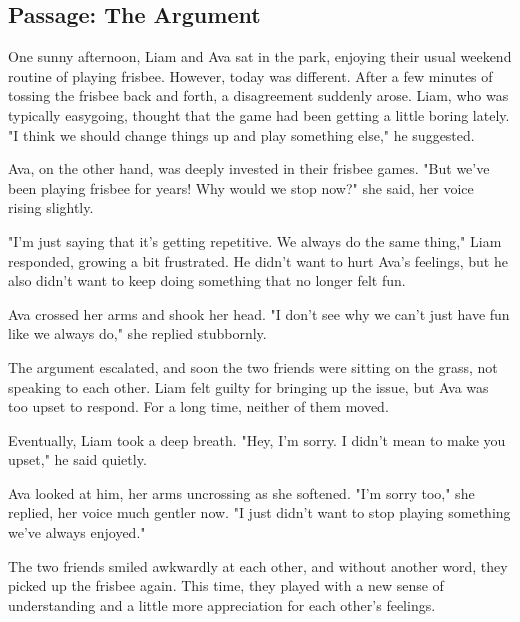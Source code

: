 \documentclass[12pt]{article}
\begin{document}
\onehalfspacing

\subsection*{Passage: The Argument}

\begin{tcolorbox}[colframe=black!40, colback=gray!5]
\begin{spacing}{1.15}
    One sunny afternoon, Liam and Ava sat in the park, enjoying their usual weekend routine of playing frisbee. However, today was different. After a few minutes of tossing the frisbee back and forth, a disagreement suddenly arose. Liam, who was typically easygoing, thought that the game had been getting a little boring lately. "I think we should change things up and play something else," he suggested.

    Ava, on the other hand, was deeply invested in their frisbee games. "But we’ve been playing frisbee for years! Why would we stop now?" she said, her voice rising slightly.

    "I’m just saying that it’s getting repetitive. We always do the same thing," Liam responded, growing a bit frustrated. He didn’t want to hurt Ava’s feelings, but he also didn’t want to keep doing something that no longer felt fun.

    Ava crossed her arms and shook her head. "I don’t see why we can’t just have fun like we always do," she replied stubbornly.

    The argument escalated, and soon the two friends were sitting on the grass, not speaking to each other. Liam felt guilty for bringing up the issue, but Ava was too upset to respond. For a long time, neither of them moved.

    Eventually, Liam took a deep breath. "Hey, I’m sorry. I didn’t mean to make you upset," he said quietly.

    Ava looked at him, her arms uncrossing as she softened. "I’m sorry too," she replied, her voice much gentler now. "I just didn’t want to stop playing something we’ve always enjoyed."

    The two friends smiled awkwardly at each other, and without another word, they picked up the frisbee again. This time, they played with a new sense of understanding and a little more appreciation for each other’s feelings.
\end{spacing}
\end{tcolorbox}

\end{document}

